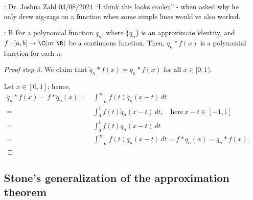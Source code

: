 \begin{nquote}{: Dr. Joshua Zahl 03/08/2024}
    ``I think this looks cooler.'' - when asked why he only drew zig-zags on a function when some simple lines would've also worked.
\end{nquote}
\begin{ntheorem}{: B}
    For a polynomial function \(q_n\), where \(\{q_n\}\) is an approximate identity, and \(f:[a,b]\to\C (\text{or}~\R)\) be a continuous function. Then, \(q_n\ast f(x)\) is a polynomial function for each \(n\).
\end{ntheorem}
\begin{proof}[Proof step-3]
    We claim that \(\tilde{q}_n\ast f(x)=q_n\ast f(x)\) for all \(x\in[0,1)\).

    \medskip

    Let \(x\in[0,1]\); hence, 
    \begin{align*} 
        \tilde{q}_n\ast f(x)=f\ast\tilde{q}_n(x)=&\int_{-\infty}^{\infty} f(t)\tilde{q}_n(x-t) \, dt\\
        =&\int_{0}^{1} f(t)\tilde{q}_n(x-t) \, dt,\quad\text{here}~x-t\in[-1,1]\\
        =&\int_{0}^{1} f(t)q_n(x-t) \, dt\\
        =&\int_{-\infty}^{\infty} f(t)q_n(x-t) \, dt=f\ast q_n(x)=q_n\ast f(x).
    \end{align*}
\end{proof}

\subsection{Stone's generalization of the \Weierstass approximation theorem}

